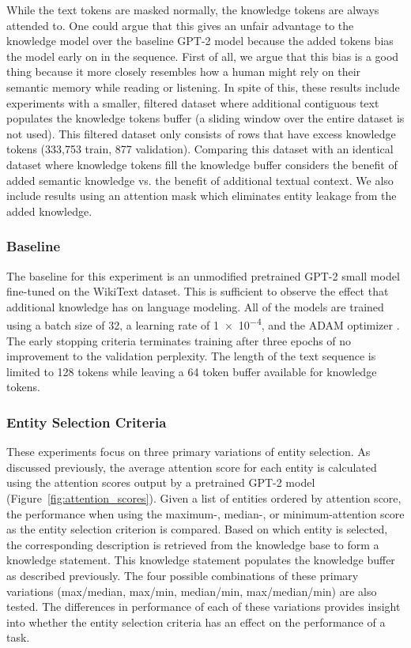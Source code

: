 \documentclass[phd,electronic,oneside,twosidetoc,letterpaper,chaptercenter,parttop,lof]{byumsphd}
\begin{document}
While the text tokens are masked normally, the knowledge tokens are always attended to.
One could argue that this gives an unfair advantage to the knowledge model over the baseline GPT-2 model because the added tokens bias the model early on in the sequence.
First of all, we argue that this bias is a good thing because it more closely resembles how a human might rely on their semantic memory while reading or listening.
In spite of this, these results include experiments with a smaller, filtered dataset where additional contiguous text populates the knowledge tokens buffer (a sliding window over the entire dataset is not used).
This filtered dataset only consists of rows that have excess knowledge tokens (333,753 train, 877 validation). 
Comparing this dataset with an identical dataset where knowledge tokens fill the knowledge buffer considers the benefit of added semantic knowledge vs. the benefit of additional textual context.
We also include results using an attention mask which eliminates entity leakage from the added knowledge.

\subsubsection{Baseline}

The baseline for this experiment is an unmodified pretrained GPT-2 small model fine-tuned on the WikiText dataset.
This is sufficient to observe the effect that additional knowledge has on language modeling.
All of the models are trained using a batch size of 32, a learning rate of \num{1e-4}, and the ADAM optimizer \cite{kingma2015adam}.
The early stopping criteria terminates training after three epochs of no improvement to the validation perplexity.
The length of the text sequence is limited to 128 tokens while leaving a 64 token buffer available for knowledge tokens.
        
\subsubsection{Entity Selection Criteria}

These experiments focus on three primary variations of entity selection.
As discussed previously, the average attention score for each entity is calculated using the attention scores output by a pretrained GPT-2 model (Figure~\ref{fig:attention_scores}).
Given a list of entities ordered by attention score, the performance when using the maximum-, median-, or minimum-attention score as the entity selection criterion is compared. Based on which entity is selected, the corresponding description is retrieved from the knowledge base to form a knowledge statement.
This knowledge statement populates the knowledge buffer as described previously.
The four possible combinations of these primary variations (max/median, max/min, median/min, max/median/min) are also tested.
The differences in performance of each of these variations provides insight into whether the entity selection criteria has an effect on the performance of a task.
\end{document}
